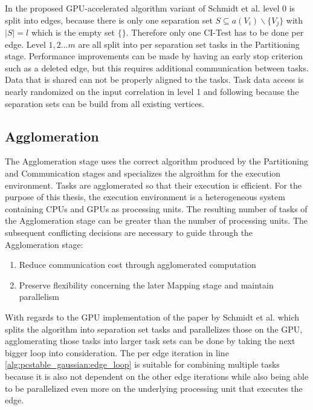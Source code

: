 In the proposed GPU-accelerated algorithm variant of Schmidt et al. \cite{schmidtOrderIndependentConstraintBasedCausal2018} level 0 is split into edges, because there is only one separation set $S \subseteq a(V_i ) \backslash \{V_j\}$ with $| S | = l$ which is the empty set $\{\}$. Therefore only one CI-Test has to be done per edge.
Level $1,2 ... m$ are all split into per separation set tasks in the Partitioning stage. Performance improvements can be made by having an early stop criterion such as a deleted edge, but this requires additional communication between tasks. Data that is shared can not be properly aligned to the tasks. Task data access is nearly randomized on the input correlation in level 1 and following because the separation sets can be build from all existing vertices. 

    
\subsection{Agglomeration}
The Agglomeration stage uses the correct algorithm produced by the Partitioning and Communication stages and specializes the algroithm for the execution environment. Tasks are agglomerated so that their execution is efficient. For the purpose of this thesis, the execution environment is a heterogeneous system containing CPUs and GPUs as processing units. The resulting number of tasks of the Agglomeration stage can be greater than the number of processing units. The subsequent conflicting decisions are necessary to guide through the Agglomeration stage:

\begin{enumerate}
    \item Reduce communication cost through agglomerated computation
    \item Preserve flexibility concerning the later Mapping stage and maintain parallelism
\end{enumerate}

With regards to the GPU implementation of the paper by Schmidt et al. \cite{schmidtOrderIndependentConstraintBasedCausal2018} which splits the algorithm into separation set tasks and parallelizes those on the GPU, agglomerating those tasks into larger task sets can be done by 
taking the next bigger loop into consideration. The per edge iteration in line \ref{alg:pcstable_gaussian:edge_loop} is suitable for combining multiple tasks because it is also not dependent on the other edge iterations while also being able to be parallelized even more on the underlying processing unit that executes the edge.

